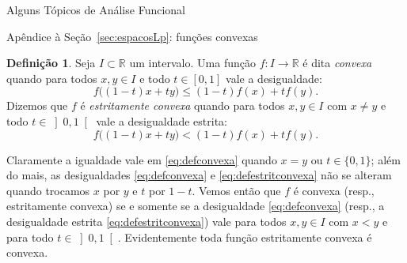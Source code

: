 \documentclass[oneside,final,11pt]{amsbook}
\newcommand{\R}{\mathds R}
\theoremstyle{remark}\newtheorem{exercise}{Exercício}[chapter]
\theoremstyle{remark}\newtheorem{*exercise}[exercise]{\hbox to 0pt{\hskip 0pt minus 1fil*}Exercício}
\theoremstyle{definition}\newtheorem{exdefin}{Definição}[chapter]
\theoremstyle{plain}\newtheorem{teo}{Teorema}[section]
\theoremstyle{plain}\newtheorem{lem}[teo]{Lema}
\theoremstyle{plain}\newtheorem{prop}[teo]{Proposição}
\theoremstyle{plain}\newtheorem{cor}[teo]{Corolário}
\theoremstyle{definition}\newtheorem{defin}[teo]{Definição}
\theoremstyle{remark}\newtheorem{rem}[teo]{Observação}
\theoremstyle{definition}\newtheorem{notation}[teo]{Notação}
\theoremstyle{definition}\newtheorem{convention}[teo]{Convenção}
\theoremstyle{definition}\newtheorem{example}[teo]{Exemplo}
\numberwithin{section}{chapter}
\numberwithin{equation}{section}
\begin{document}
\begin{chapter}{Alguns Tópicos de Análise Funcional}
\begin{section}{Apêndice à Seção~\ref{sec:espacosLp}: funções convexas}
\begin{defin}
Seja $I\subset\R$ um intervalo. Uma função $f:I\to\R$ é dita
{\em convexa\/} quando para todos $x,y\in I$
e todo $t\in[0,1]$ vale a desigualdade:
\begin{equation}\label{eq:defconvexa}
f\big((1-t)x+ty\big)\le(1-t)f(x)+tf(y).
\end{equation}
Dizemos que $f$ é
{\em estritamente convexa\/}
quando para todos $x,y\in I$ com $x\ne y$ e todo $t\in\left]0,1\right[$ vale a desigualdade estrita:
\begin{equation}\label{eq:defestritconvexa}
f\big((1-t)x+ty\big)<(1-t)f(x)+tf(y).
\end{equation}
\end{defin}
Claramente a igualdade vale em \eqref{eq:defconvexa} quando $x=y$ ou $t\in\{0,1\}$;
além do mais, as desigualdades \eqref{eq:defconvexa} e \eqref{eq:defestritconvexa}
não se alteram quando trocamos $x$ por $y$ e $t$ por $1-t$. Vemos então que
$f$ é convexa (resp., estritamente convexa) se e somente se a desigualdade
\eqref{eq:defconvexa} (resp., a desigualdade estrita \eqref{eq:defestritconvexa})
vale para todos $x,y\in I$ com $x<y$ e para todo $t\in\left]0,1\right[$.
Evidentemente toda função estritamente convexa é convexa.


\end{section}
\end{chapter}
\end{document}
